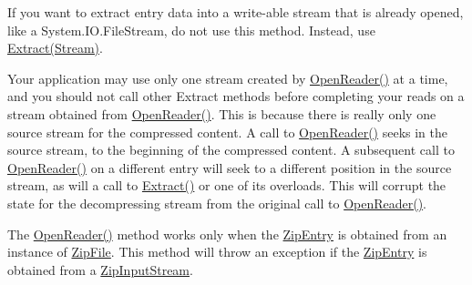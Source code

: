 If you want to extract entry data into a write-\/able stream that is already opened, like a System.\+I\+O.\+File\+Stream, do not use this method. Instead, use \mbox{\hyperlink{class_super_tiled2_unity_1_1_ionic_1_1_zip_1_1_zip_entry_a13e055aec36ff9eb116526778dd413fe}{Extract(\+Stream)}}. 

Your application may use only one stream created by \mbox{\hyperlink{class_super_tiled2_unity_1_1_ionic_1_1_zip_1_1_zip_entry_a825692bb86f2c5da7eefc1e9714ae18c}{Open\+Reader()}} at a time, and you should not call other Extract methods before completing your reads on a stream obtained from \mbox{\hyperlink{class_super_tiled2_unity_1_1_ionic_1_1_zip_1_1_zip_entry_a825692bb86f2c5da7eefc1e9714ae18c}{Open\+Reader()}}. This is because there is really only one source stream for the compressed content. A call to \mbox{\hyperlink{class_super_tiled2_unity_1_1_ionic_1_1_zip_1_1_zip_entry_a825692bb86f2c5da7eefc1e9714ae18c}{Open\+Reader()}} seeks in the source stream, to the beginning of the compressed content. A subsequent call to \mbox{\hyperlink{class_super_tiled2_unity_1_1_ionic_1_1_zip_1_1_zip_entry_a825692bb86f2c5da7eefc1e9714ae18c}{Open\+Reader()}} on a different entry will seek to a different position in the source stream, as will a call to \mbox{\hyperlink{class_super_tiled2_unity_1_1_ionic_1_1_zip_1_1_zip_entry_a9d65543aadd23e47e188175412891b42}{Extract()}} or one of its overloads. This will corrupt the state for the decompressing stream from the original call to \mbox{\hyperlink{class_super_tiled2_unity_1_1_ionic_1_1_zip_1_1_zip_entry_a825692bb86f2c5da7eefc1e9714ae18c}{Open\+Reader()}}. 

The {\ttfamily \mbox{\hyperlink{class_super_tiled2_unity_1_1_ionic_1_1_zip_1_1_zip_entry_a825692bb86f2c5da7eefc1e9714ae18c}{Open\+Reader()}}} method works only when the \mbox{\hyperlink{class_super_tiled2_unity_1_1_ionic_1_1_zip_1_1_zip_entry}{Zip\+Entry}} is obtained from an instance of {\ttfamily \mbox{\hyperlink{class_super_tiled2_unity_1_1_ionic_1_1_zip_1_1_zip_file}{Zip\+File}}}. This method will throw an exception if the \mbox{\hyperlink{class_super_tiled2_unity_1_1_ionic_1_1_zip_1_1_zip_entry}{Zip\+Entry}} is obtained from a \mbox{\hyperlink{class_super_tiled2_unity_1_1_ionic_1_1_zip_1_1_zip_input_stream}{Zip\+Input\+Stream}}. 

